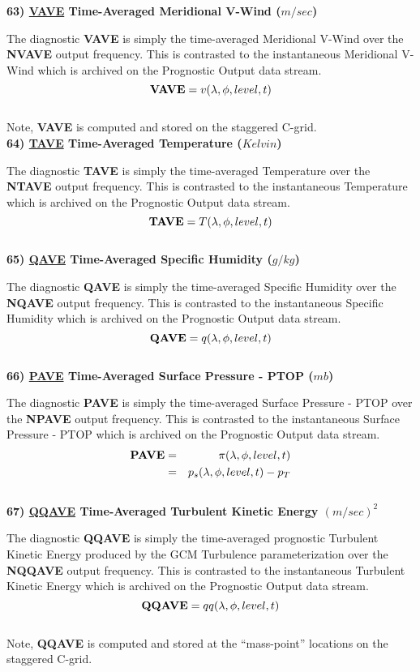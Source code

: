 \noindent
{\bf 63)  \underline {VAVE} Time-Averaged Meridional V-Wind ($m/sec$) }

\noindent
The diagnostic {\bf VAVE} is simply the time-averaged Meridional V-Wind over
the {\bf NVAVE} output frequency.  This is contrasted to the instantaneous
Meridional V-Wind which is archived on the Prognostic Output data stream.
\[
{\bf VAVE} = v(\lambda, \phi, level , t)
\]
\\
Note, {\bf VAVE} is computed and stored on the staggered C-grid.
\\

\noindent
{\bf 64)  \underline {TAVE} Time-Averaged Temperature ($Kelvin$) }

\noindent
The diagnostic {\bf TAVE} is simply the time-averaged Temperature over
the {\bf NTAVE} output frequency.  This is contrasted to the instantaneous
Temperature which is archived on the Prognostic Output data stream.
\[
{\bf TAVE} = T(\lambda, \phi, level , t)
\]
\\

\noindent
{\bf 65)  \underline {QAVE} Time-Averaged Specific Humidity ($g/kg$) }

\noindent
The diagnostic {\bf QAVE} is simply the time-averaged Specific Humidity over
the {\bf NQAVE} output frequency.  This is contrasted to the instantaneous
Specific Humidity which is archived on the Prognostic Output data stream.
\[
{\bf QAVE} = q(\lambda, \phi, level , t)
\]
\\

\noindent
{\bf 66)  \underline {PAVE} Time-Averaged Surface Pressure - PTOP ($mb$) }

\noindent
The diagnostic {\bf PAVE} is simply the time-averaged Surface Pressure - PTOP over
the {\bf NPAVE} output frequency.  This is contrasted to the instantaneous
Surface Pressure - PTOP which is archived on the Prognostic Output data stream.
\begin{eqnarray*}
{\bf PAVE} & =  & \pi(\lambda, \phi, level , t) \\
           & =  & p_s(\lambda, \phi, level , t) - p_T
\end{eqnarray*}
\\

 
\noindent
{\bf 67)  \underline {QQAVE} Time-Averaged Turbulent Kinetic Energy $(m/sec)^2$ }
 
\noindent
The diagnostic {\bf QQAVE} is simply the time-averaged prognostic Turbulent Kinetic Energy 
produced by the GCM Turbulence parameterization over
the {\bf NQQAVE} output frequency.  This is contrasted to the instantaneous
Turbulent Kinetic Energy which is archived on the Prognostic Output data stream.
\[
{\bf QQAVE} = qq(\lambda, \phi, level , t)
\]
\\
Note, {\bf QQAVE} is computed and stored at the ``mass-point'' locations on the staggered C-grid.
\\
 
